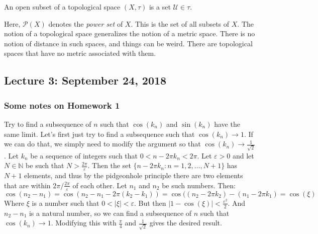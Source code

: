 \documentclass[crop=false,class=article,oneside]{standalone}
\begin{document}
            \begin{definition}
                An open subset of a topological space
                $(X,\tau)$ is a set $\mathcal{U}\in\tau$.
            \end{definition}
            Here, $\mathcal{P}(X)$ denotes the \textit{power set}
            of $X$. This is the set of all subsets of $X$.
            The notion of a topological space generalizes the
            notion of a metric space. There is no notion of
            distance in such spaces, and things can be weird.
            There are topological spaces that have no metric
            associated with them.
    \subsection{Lecture 3: September 24, 2018}
        \subsubsection{Some notes on Homework 1}
            Try to find a subsequence of $n$ such
            that $\cos(k_{n})$ and $\sin(k_{n})$
            have the same limit. Let's first just
            try to find a subsequence such that
            $\cos(k_{n})\rightarrow{1}$. If we can
            do that, we simply need to modify the
            argument so that
            $\cos(k_{n})\rightarrow{\frac{1}{\sqrt{2}}}$.
            Let $k_{n}$ be a sequence of integers
            such that $0<n-2\pi{k_{n}}<2\pi$.
            Let $\varepsilon>0$ and let $N\in\mathbb{N}$
            be such that $N>\frac{2\pi}{\varepsilon}$.
            Then the set
            $\{n-2\pi{k_{n}}:n=1,2,\hdots,N+1\}$
            has $N+1$ elements, and thus by the
            pidgeonhole principle there are two
            elements that are within
            $2\pi/\frac{2\pi}{\varepsilon}$ of each other.
            Let $n_{1}$ and $n_{2}$ be such numbers.
            Then:
            \begin{equation*}
                \cos(n_{2}-n_{1})
                =\cos(n_{2}-n_{1}-2\pi(k_{2}-k_{1}))
                =\cos((n_{2}-2\pi{k}_{2})
                       -(n_{1}-2\pi{k_{1}})
                =\cos(\xi)
            \end{equation*}
            Where $\xi$ is a number such that
            $0<|\xi|<\varepsilon$. But then
            $|1-\cos(\xi)|<\frac{\varepsilon^{2}}{2}$.
            And $n_{2}-n_{1}$ is a natural number,
            so we can find a subsequence of $n$ such
            that $\cos(k_{n})\rightarrow{1}$. Modifying
            this with $\frac{\pi}{4}$
            and $\frac{1}{\sqrt{2}}$ gives the
            desired result.
\end{document}
